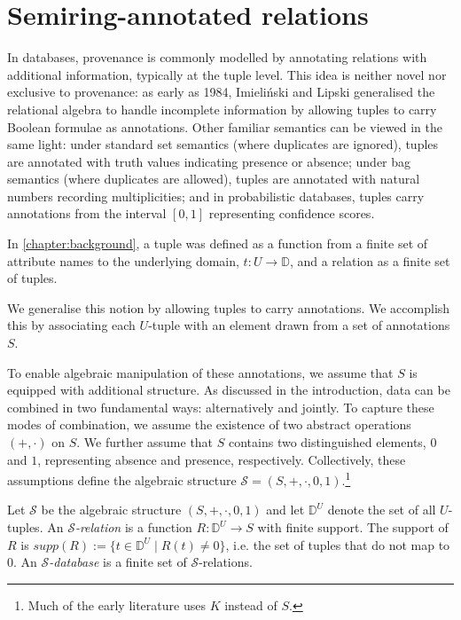 \documentclass[oneside, 11pt]{amsbook}
\theoremstyle{plain}
\theoremstyle{definition}
\theoremstyle{remark}
\begin{document}
\section{Semiring-annotated relations}

In databases, provenance is commonly modelled by annotating relations with additional information, typically at the tuple level. This idea is neither novel nor exclusive to provenance: as early as 1984, Imieliński and Lipski \cite{Imielinski1984} generalised the relational algebra to handle incomplete information by allowing tuples to carry Boolean formulae as annotations. Other familiar semantics can be viewed in the same light: under standard set semantics (where duplicates are ignored), tuples are annotated with truth values indicating presence or absence; under bag semantics (where duplicates are allowed), tuples are annotated with natural numbers recording multiplicities; and in probabilistic databases, tuples carry annotations from the interval $[0,1]$ representing confidence scores.

In \autoref{chapter:background}, a tuple was defined as a function from a finite set of attribute names to the underlying domain, $t : U \to \mathbb{D}$, and a relation as a finite set of tuples.

We generalise this notion by allowing tuples to carry annotations. We accomplish this by associating each $U$-tuple with an element drawn from a set of annotations $S$.

To enable algebraic manipulation of these annotations, we assume that $S$ is equipped with additional structure. As discussed in the introduction, data can be combined in two fundamental ways: alternatively and jointly. To capture these modes of combination, we assume the existence of two abstract operations $(+, \cdot)$ on $S$. We further assume that $S$ contains two distinguished elements, $0$ and $1$, representing absence and presence, respectively. Collectively, these assumptions define the algebraic structure $\mathcal{S} = (S,+,\cdot,0,1)$.\footnote{Much of the early literature uses $K$ instead of $S$.}

\begin{defn}
    Let $\mathcal{S}$ be the algebraic structure $(S,+,\cdot,0,1)$ and let $\mathbb{D}^U$ denote the set of all $U$-tuples. An \emph{$\mathcal{S}$-relation} is a function $R : \mathbb{D}^U \to S$ with finite support. The support of $R$ is $supp(R) := \{ t \in \mathbb{D}^U \mid R(t) \neq 0 \}$, i.e. the set of tuples that do not map to $0$. An \emph{$\mathcal{S}$-database} is a finite set of $\mathcal{S}$-relations.
\end{defn}
\end{document}
